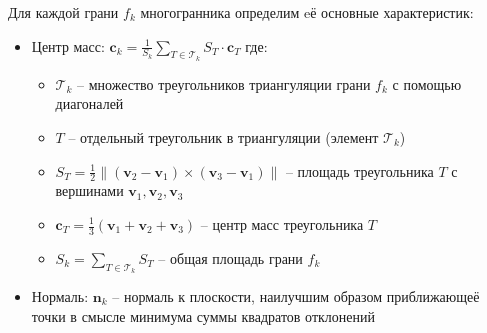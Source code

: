 \documentclass[a4paper,14pt]{extarticle}
\begin{document}
Для каждой грани $f_k$ многогранника определим eё основные характеристик:
\begin{itemize}
    \item Центр масс: $\mathbf{c}_k = \frac{1}{S_k} \sum\limits_{T \in \mathcal{T}_k} S_T \cdot \mathbf{c}_T$
    \noindent где:
    \begin{itemize}
        \item $\mathcal{T}_k$ -- множество треугольников триангуляции грани $f_k$ с помощью диагоналей
        \item $T$ -- отдельный треугольник в триангуляции (элемент $\mathcal{T}_k$)
        \item $S_T = \frac{1}{2}\|(\mathbf{v}_2 - \mathbf{v}_1) \times (\mathbf{v}_3 - \mathbf{v}_1)\|$ -- площадь треугольника $T$ 
            с вершинами $\mathbf{v}_1, \mathbf{v}_2, \mathbf{v}_3$
        \item $\mathbf{c}_T = \frac{1}{3}(\mathbf{v}_1 + \mathbf{v}_2 + \mathbf{v}_3)$ -- центр масс треугольника $T$
        \item $S_k = \sum_{T \in \mathcal{T}_k} S_T$ -- общая площадь грани $f_k$
    \end{itemize}
    \item Нормаль: $\mathbf{n}_k$ -- нормаль к плоскости, наилучшим образом приближающеё точки в смысле минимума суммы квадратов отклонений
\end{itemize}
\end{document}
